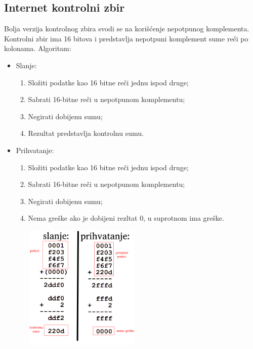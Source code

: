 \documentclass[a4paper]{article}
\begin{document}
\subsection{Internet kontrolni zbir} 
    Bolja verzija kontrolnog zbira svodi se na korišćenje
    nepotpunog komplementa. Kontrolni zbir ima 16 bitova i predstavlja nepotpuni komplement
    sume reči po kolonama. Algoritam:
    \begin{itemize}
        \item Slanje:
            \begin{enumerate}
                \item Složiti podatke kao 16 bitne reči jednu ispod druge;
                \item Sabrati 16-bitne reči u nepotpunom komplementu;
                \item Negirati dobijenu sumu;
                \item Rezultat predstavlja kontrolnu sumu.
            \end{enumerate}
        \item Prihvatanje:
            \begin{enumerate}
                \item Složiti podatke kao 16 bitne reči jednu ispod druge;
                \item Sabrati 16-bitne reči u nepotpunom komplementu;
                \item Negirati dobijenu sumu;
                \item Nema greške ako je dobijeni rezltat 0, u suprotnom ima greške.
            \end{enumerate}
    \end{itemize}
    \begin{figure}[H]
    \begin{center}
        \includegraphics[width=60mm,height=60mm]{Slike/detekcija2.png}
    \end{center}
    \end{figure}
\end{document}
